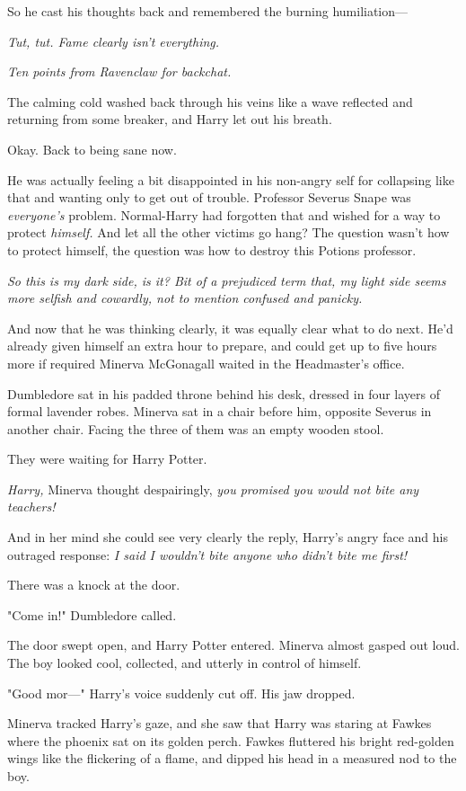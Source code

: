 So he cast his thoughts back and remembered the burning humiliation---

\emph{Tut, tut. Fame clearly isn't everything.}

\emph{Ten points from Ravenclaw for backchat.}

The calming cold washed back through his veins like a wave reflected and
returning from some breaker, and Harry let out his breath.

Okay. Back to being sane now.

He was actually feeling a bit disappointed in his non-angry self for collapsing
like that and wanting only to get out of trouble. Professor Severus Snape was
\emph{everyone's} problem. Normal-Harry had forgotten that and wished for a way
to protect \emph{himself.} And let all the other victims go hang? The question
wasn't how to protect himself, the question was how to destroy this Potions
professor.

\emph{So this is my dark side, is it? Bit of a prejudiced term that, my light
side seems more selfish and cowardly, not to mention confused and panicky.}

And now that he was thinking clearly, it was equally clear what to do next.
He'd already given himself an extra hour to prepare, and could get up to five
hours more if required{\el}
\sbreak
Minerva McGonagall waited in the Headmaster's office.

Dumbledore sat in his padded throne behind his desk, dressed in four layers of
formal lavender robes. Minerva sat in a chair before him, opposite Severus in
another chair. Facing the three of them was an empty wooden stool.

They were waiting for Harry Potter.

\emph{Harry,} Minerva thought despairingly, \emph{you promised you would not
bite any teachers!}

And in her mind she could see very clearly the reply, Harry's angry face and
his outraged response: \emph{I said I wouldn't bite anyone who didn't bite me
first!}

There was a knock at the door.

"Come in!" Dumbledore called.

The door swept open, and Harry Potter entered. Minerva almost gasped out loud.
The boy looked cool, collected, and utterly in control of himself.

"Good mor\mbox{---}" Harry's voice suddenly cut off. His jaw dropped.

Minerva tracked Harry's gaze, and she saw that Harry was staring at Fawkes
where the phoenix sat on its golden perch. Fawkes fluttered his bright
red-golden wings like the flickering of a flame, and dipped his head in a
measured nod to the boy.

